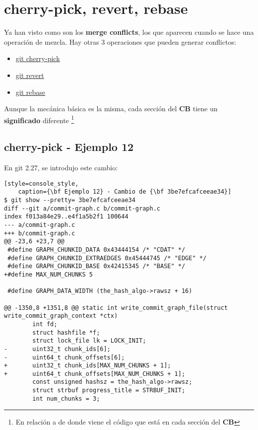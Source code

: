 
\section{cherry-pick, revert, rebase}
\label{other_ops}

Ya han visto como son los {\bf merge conflicts}, los que aparecen cuando se hace una operación de mezcla.
Hay otras 3 operaciones que pueden generar conflictos:

\begin{itemize}
	\item \hyperref[cherry_pick]{git cherry-pick}
	\item \hyperref[revert]{git revert}
	\item \hyperref[rebase]{git rebase}
\end{itemize}

Aunque la mecánica básica es la misma, cada sección del {\bf CB} tiene un {\bf significado} diferente
\footnote{En relación a de donde viene el código que está en cada sección del {\bf CB}}

\subsection{cherry-pick - Ejemplo 12}
\label{cherry_pick}
\label{example_12}

En git 2.27, se introdujo este cambio:
\begin{lstlisting}[style=console_style,
	caption={\bf Ejemplo 12} - Cambio de {\bf 3be7efcafceeae34}]
$ git show --pretty= 3be7efcafceeae34
diff --git a/commit-graph.c b/commit-graph.c
index f013a84e29..e4f1a5b2f1 100644
--- a/commit-graph.c
+++ b/commit-graph.c
@@ -23,6 +23,7 @@
 #define GRAPH_CHUNKID_DATA 0x43444154 /* "CDAT" */
 #define GRAPH_CHUNKID_EXTRAEDGES 0x45444745 /* "EDGE" */
 #define GRAPH_CHUNKID_BASE 0x42415345 /* "BASE" */
+#define MAX_NUM_CHUNKS 5
 
 #define GRAPH_DATA_WIDTH (the_hash_algo->rawsz + 16)
 
@@ -1350,8 +1351,8 @@ static int write_commit_graph_file(struct write_commit_graph_context *ctx)
        int fd;
        struct hashfile *f;
        struct lock_file lk = LOCK_INIT;
-       uint32_t chunk_ids[6];
-       uint64_t chunk_offsets[6];
+       uint32_t chunk_ids[MAX_NUM_CHUNKS + 1];
+       uint64_t chunk_offsets[MAX_NUM_CHUNKS + 1];
        const unsigned hashsz = the_hash_algo->rawsz;
        struct strbuf progress_title = STRBUF_INIT;
        int num_chunks = 3;
\end{lstlisting}

